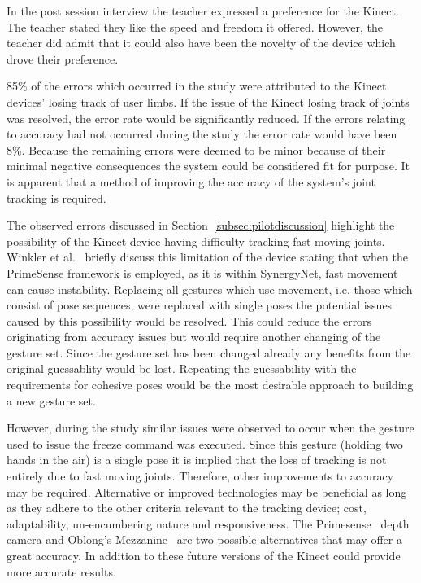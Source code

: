 \documentclass[link]{IWCOMP}
\begin{document}
In the post session interview the teacher expressed a preference for the Kinect.
The teacher stated they like the speed and freedom it offered.
However, the teacher did admit that it could also have been the novelty of the device which drove their preference.

85\% of the errors which occurred in the study were attributed to the Kinect devices' losing track of user limbs.
If the issue of the Kinect losing track of joints was resolved, the error rate would be significantly reduced.
If the errors relating to accuracy had not occurred during the study the error rate would have been 8\%.
Because the remaining errors were deemed to be minor because of their minimal negative consequences the system could be considered fit for purpose.
It is apparent that a method of improving the accuracy of the system's joint tracking is required.

The observed errors discussed in Section~\ref{subsec:pilotdiscussion} highlight the possibility of the Kinect device having difficulty tracking fast moving joints.
Winkler et al.~\cite{Winkler2012} briefly discuss this limitation of the device stating that when the PrimeSense framework is employed, as it is within SynergyNet, fast movement can cause instability.
Replacing all gestures which use movement, i.e. those which consist of pose sequences, were replaced with single poses the potential issues caused by this possibility would be resolved.
This could reduce the errors originating from accuracy issues but would require another changing of the gesture set.
Since the gesture set has been changed already any benefits from the original guessablity would be lost.
Repeating the guessability with the requirements for cohesive poses would be the most desirable approach to building a new gesture set.

However, during the study similar issues were observed to occur when the gesture used to issue the freeze command was executed.
Since this gesture (holding two hands in the air) is a single pose it is implied that the loss of tracking is not entirely due to fast moving joints.
Therefore, other improvements to accuracy may be required.
Alternative or improved technologies may be beneficial as long as they adhere to the other criteria relevant to the tracking device; cost, adaptability, un-encumbering nature and responsiveness.
The Primesense~\cite{Wilson2010} depth camera and Oblong's Mezzanine~\cite{kramer2011} are two possible alternatives that may offer a great accuracy.
In addition to these future versions of the Kinect could provide more accurate results.
\end{document}
